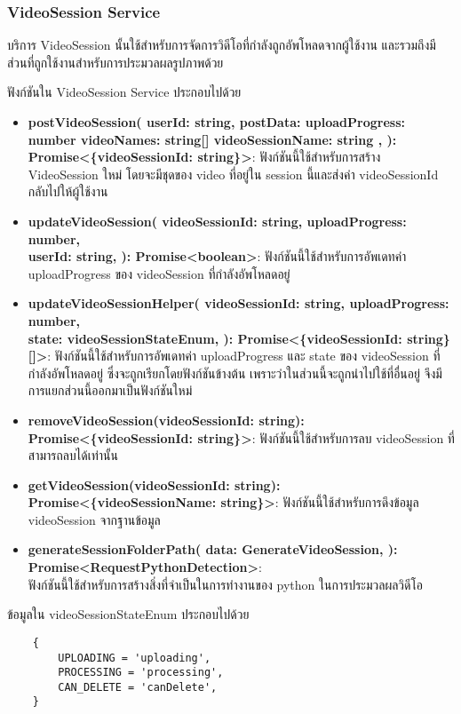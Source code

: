 \subsubsection{VideoSession Service}

\ifenglish
\else
บริการ VideoSession นั้นใช้สำหรับการจัดการวิดีโอที่กำลังถูกอัพโหลดจากผู้ใช้งาน และรวมถึงมีส่วนที่ถูกใช้งานสำหรับการประมวลผลรูปภาพด้วย

ฟังก์ชันใน VideoSession Service ประกอบไปด้วย
\begin{itemize}
    \item \textbf{postVideoSession(
        userId: string,
        postData: {
          uploadProgress: number
          videoNames: string[]
          videoSessionName: string
        },
    ): Promise<\{videoSessionId: string\}>}:
    ฟังก์ชันนี้ใช้สำหรับการสร้าง VideoSession ใหม่ โดยจะมีชุดของ video ที่อยู่ใน session นี้และส่งค่า videoSessionId กลับไปให้ผู้ใช้งาน
    \item \textbf{updateVideoSession(
        videoSessionId: string,
        uploadProgress: number,
        \\userId: string,
    ): Promise<boolean>}: ฟังก์ชันนี้ใช้สำหรับการอัพเดทค่า uploadProgress ของ videoSession ที่กำลังอัพโหลดอยู่
    \item \textbf{updateVideoSessionHelper(
        videoSessionId: string,
        uploadProgress: number,
        \\state: videoSessionStateEnum,
    ): Promise<\{videoSessionId: string\}[]>}: ฟังก์ชันนี้ใช้สำหรับการอัพเดทค่า uploadProgress และ state ของ videoSession ที่กำลังอัพโหลดอยู่ ซึ่งจะถูกเรียกโดยฟังก์ชันข้างต้น เพราะว่าในส่วนนี้จะถูกนำไปใช้ที่อื่นอยู่ จึงมีการแยกส่วนนี้ออกมาเป็นฟังก์ชันใหม่
    \item \textbf{removeVideoSession(videoSessionId: string): Promise<\{videoSessionId: string\}>}: ฟังก์ชันนี้ใช้สำหรับการลบ videoSession ที่สามารถลบได้เท่านั้น
    \item \textbf{getVideoSession(videoSessionId: string): Promise<\{videoSessionName: string\}>}: ฟังก์ชันนี้ใช้สำหรับการดึงข้อมูล videoSession จากฐานข้อมูล
    \item \textbf{generateSessionFolderPath(
        data: GenerateVideoSession,
      ): \\Promise<RequestPythonDetection>}:
    \\ฟังก์ชันนี้ใช้สำหรับการสร้างสิ่งที่จำเป็นในการทำงานของ python ในการประมวลผลวิดีโอ
\end{itemize}

ข้อมูลใน videoSessionStateEnum ประกอบไปด้วย
\begin{lstlisting}
    {
        UPLOADING = 'uploading',
        PROCESSING = 'processing',
        CAN_DELETE = 'canDelete',
    }
\end{lstlisting}

